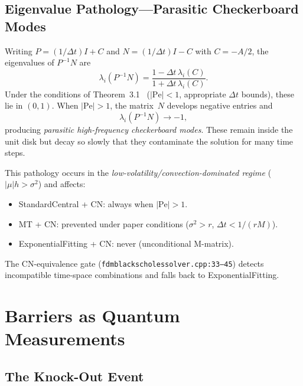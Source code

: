 \subsection{Eigenvalue Pathology---Parasitic Checkerboard Modes}

Writing $P = (1/\Delta t)I + C$ and $N = (1/\Delta t)I - C$ with $C = -A/2$, the eigenvalues of $P^{-1}N$ are
\begin{equation}\label{eq:eigenvalue-map}
  \lambda_i(P^{-1}N) = \frac{1 - \Delta t\,\lambda_i(C)}{1 + \Delta t\,\lambda_i(C)}.
\end{equation}
Under the conditions of Theorem~3.1~\cite{MilevTagliani2010a} ($|\mathrm{Pe}| < 1$, appropriate $\Delta t$ bounds), these lie in $(0,1)$.  When $|\mathrm{Pe}| > 1$, the matrix~$N$ develops negative entries and
\begin{equation*}
  \lambda_i(P^{-1}N) \to -1,
\end{equation*}
producing \emph{parasitic high-frequency checkerboard modes}.  These remain inside the unit disk but decay so slowly that they contaminate the solution for many time steps.

This pathology occurs in the \emph{low-volatility/convection-dominated regime} ($|\mu|h > \sigma^2$) and affects:
\begin{itemize}
  \item StandardCentral + CN: always when $|\mathrm{Pe}| > 1$.
  \item MT + CN: prevented under paper conditions ($\sigma^2 > r$, $\Delta t < 1/(rM)$).
  \item ExponentialFitting + CN: never (unconditional M-matrix).
\end{itemize}

The CN-equivalence gate (\texttt{fdmblackscholessolver.cpp:33--45}) detects incompatible time-space combinations and falls back to ExponentialFitting.

\section{Barriers as Quantum Measurements}
\label{sec:barriers}

\subsection{The Knock-Out Event}

